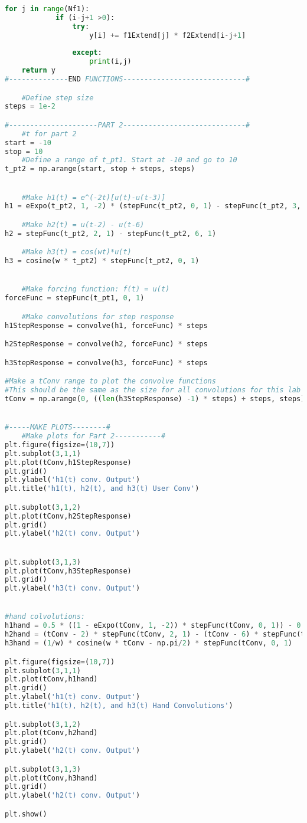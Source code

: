 \documentclass[12pt,a4paper]{article}
\begin{document}
\begin{lstlisting}[language=Python]
        for j in range(Nf1):
            if (i-j+1 >0):
                try:
                    y[i] += f1Extend[j] * f2Extend[i-j+1]
                
                except:
                    print(i,j)
    return y
#--------------END FUNCTIONS-----------------------------#

    #Define step size
steps = 1e-2

#---------------------PART 2-----------------------------#
    #t for part 2
start = -10
stop = 10
    #Define a range of t_pt1. Start at -10 and go to 10 
t_pt2 = np.arange(start, stop + steps, steps)


    #Make h1(t) = e^(-2t)[u(t)-u(t-3)]
h1 = eExpo(t_pt2, 1, -2) * (stepFunc(t_pt2, 0, 1) - stepFunc(t_pt2, 3, 1))

    #Make h2(t) = u(t-2) - u(t-6)
h2 = stepFunc(t_pt2, 2, 1) - stepFunc(t_pt2, 6, 1)

    #Make h3(t) = cos(wt)*u(t)
h3 = cosine(w * t_pt2) * stepFunc(t_pt2, 0, 1)


    #Make forcing function: f(t) = u(t)
forceFunc = stepFunc(t_pt1, 0, 1)

    #Make convolutions for step response
h1StepResponse = convolve(h1, forceFunc) * steps

h2StepResponse = convolve(h2, forceFunc) * steps

h3StepResponse = convolve(h3, forceFunc) * steps

#Make a tConv range to plot the convolve functions
#This should be the same as the size for all convolutions for this lab
tConv = np.arange(0, ((len(h3StepResponse) -1) * steps) + steps, steps) -20


#-----MAKE PLOTS--------#
    #Make plots for Part 2-----------#
plt.figure(figsize=(10,7))
plt.subplot(3,1,1)
plt.plot(tConv,h1StepResponse)
plt.grid()
plt.ylabel('h1(t) conv. Output')
plt.title('h1(t), h2(t), and h3(t) User Conv')

plt.subplot(3,1,2)
plt.plot(tConv,h2StepResponse)
plt.grid()
plt.ylabel('h2(t) conv. Output')


plt.subplot(3,1,3)
plt.plot(tConv,h3StepResponse)
plt.grid()
plt.ylabel('h3(t) conv. Output')


#hand colvolutions:
h1hand = 0.5 * ((1 - eExpo(tConv, 1, -2)) * stepFunc(tConv, 0, 1)) - 0.5 * ((1 - eExpo(tConv - 3, 1, -2)) * stepFunc(tConv, 3, 1))
h2hand = (tConv - 2) * stepFunc(tConv, 2, 1) - (tConv - 6) * stepFunc(tConv, 6, 1)
h3hand = (1/w) * cosine(w * tConv - np.pi/2) * stepFunc(tConv, 0, 1)

plt.figure(figsize=(10,7))
plt.subplot(3,1,1)
plt.plot(tConv,h1hand)
plt.grid()
plt.ylabel('h1(t) conv. Output')
plt.title('h1(t), h2(t), and h3(t) Hand Convolutions')

plt.subplot(3,1,2)
plt.plot(tConv,h2hand)
plt.grid()
plt.ylabel('h2(t) conv. Output')

plt.subplot(3,1,3)
plt.plot(tConv,h3hand)
plt.grid()
plt.ylabel('h2(t) conv. Output')

plt.show()
\end{lstlisting}
\newpage
\end{document}

